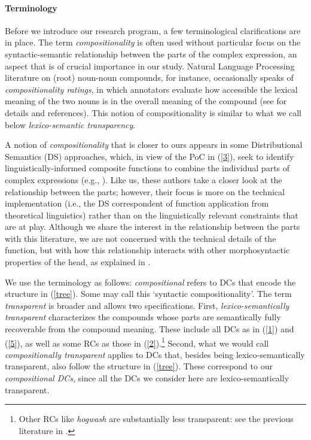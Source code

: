 \documentclass[output=paper]{langsci/langscibook}
\begin{document}
\begin{exe}
\end{exe}



\paragraph*{Terminology}
 Before we introduce our research program, a few terminological clarifications are in place. The term \textit{compositionality} is often used without particular focus on the syntactic-semantic relationship between the parts of the complex expression, an aspect that is of crucial importance in our study. Natural Language Processing literature on (root) noun-noun compounds, for instance, occasionally speaks of \textit{compositionality ratings}, in which annotators evaluate how accessible the lexical meaning of the two nouns is in the overall meaning of the compound (see  for details and references). This notion of compositionality is similar to what we call below \textit{lexico-semantic transparency}.

 A notion of \textit{compositionality} that is closer to ours appears in some Distributional Semantics (DS) approaches, which, in view of the PoC in (\ref{3}), seek to identify linguistically-informed composite functions to combine the individual parts of complex expressions (e.g., \cite{marelli:baroni:15,baroni:zamparelli:10}). Like us, these authors take a closer look at the relationship between the parts; however, their focus is more on the technical implementation (i.e., the DS correspondent of function application from theoretical linguistics) rather than on the linguistically relevant constraints that are at play. Although we share the interest in the relationship between the parts with this literature, we are not concerned with the technical details of the function, but with how this relationship interacts with other morphosyntactic properties of the head, as explained in .

We use the terminology as follows: \textit{compositional} refers to DCs that encode the structure in (\ref{tree}). Some may call this \lq syntactic compositionality\rq. The term \textit{transparent} is broader and allows two specifications. First,  \textit{lexico-semantically transparent}  characterizes the compounds whose parts are semantically fully recoverable from the compound meaning. These include all DCs as in (\ref{1}) and (\ref{5}), as well as some RCs as those in (\ref{2}).\footnote{Other RCs like \textit{hogwash} are substantially less transparent: see the previous literature in .}  Second, 
what we would call \textit{compositionally transparent} applies to DCs that, besides being lexico-semantically transparent, also follow the structure in (\ref{tree}). These correspond to our \textit{compositional DCs}, since all the DCs we consider here are lexico-semantically transparent.
\end{document}

